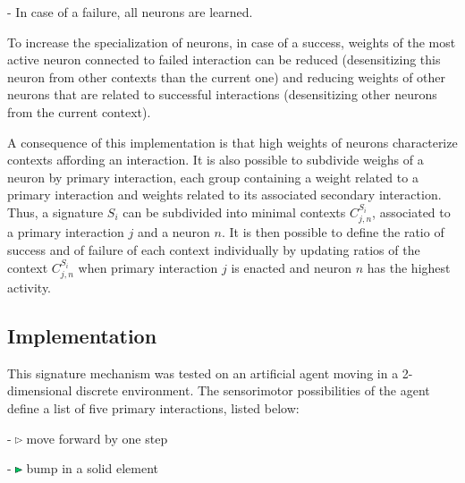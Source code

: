 \documentclass[conference]{IEEEtran}
\begin{document}
- In case of a failure, all neurons are learned.

To increase the specialization of neurons, in case of a success, weights of the most active neuron connected to failed interaction can be reduced (desensitizing this neuron from other contexts than the current one) and reducing weights of other neurons that are related to successful interactions (desensitizing other neurons from the current context).


A consequence of this implementation is that high weights of neurons characterize contexts affording an interaction. It is also possible to subdivide weighs of a neuron by primary interaction, each group containing a weight related to a primary interaction and weights related to its associated secondary interaction. Thus, a signature $S_i$ can be subdivided into minimal contexts $C_{j,n}^{S_i}$, associated to a primary interaction $j$ and a neuron $n$. It is then possible to define the ratio of success and of failure of each context individually by updating ratios of the context $C_{j,n}^{S_i}$ when primary interaction $j$ is enacted and neuron $n$ has the highest activity.

\subsection{Implementation}

This signature mechanism was tested on an artificial agent moving in a 2-dimensional discrete environment. The sensorimotor possibilities of the agent define a list of five primary interactions, listed below:

- \includegraphics[width=0.015\textwidth]{img/mf0.pdf} move forward by one step

- \includegraphics[width=0.015\textwidth]{img/mf1.pdf} bump in a solid element 
\end{document}
